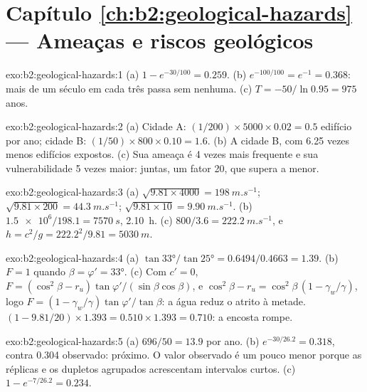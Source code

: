 \section*{Capítulo \ref{ch:b2:geological-hazards} --- Ameaças e riscos geológicos}

\begin{solution}{exo:b2:geological-hazards:1}
(a) $1 - e^{-30/100} = 0.259$. (b) $e^{-100/100} = e^{-1} = 0.368$: mais de um século em cada três
passa sem nenhuma. (c) $T = -50/\ln 0.95 = 975$ anos.
\end{solution}

\begin{solution}{exo:b2:geological-hazards:2}
(a) Cidade A: $(1/200) \times 5000 \times 0.02 = 0.5$ edifício por ano; cidade B: $(1/50) \times 800
\times 0.10 = 1.6$. (b) A cidade B, com 6.25 vezes menos edifícios expostos. (c) Sua ameaça é 4 vezes
mais frequente e sua vulnerabilidade 5 vezes maior: juntas, um fator 20, que supera a
 menor.
\end{solution}

\begin{solution}{exo:b2:geological-hazards:3}
(a) $\sqrt{9.81 \times 4000} = \qty{198}{m.s^{-1}}$; $\sqrt{9.81 \times 200} = \qty{44.3}{m.s^{-1}}$;
$\sqrt{9.81 \times 10} = \qty{9.90}{m.s^{-1}}$. (b) $\num{1.5e6}/198.1 = \qty{7570}{s}$, \qty{2.10}{h}.
(c) $800/3.6 = \qty{222.2}{m.s^{-1}}$, e $h = c^2/g = 222.2^2/9.81 = \qty{5030}{m}$.
\end{solution}

\begin{solution}{exo:b2:geological-hazards:4}
(a) $\tan\ang{33}/\tan\ang{25} = 0.6494/0.4663 = 1.39$. (b) $F = 1$ quando $\beta = \varphi' =
\ang{33}$. (c) Com $c' = 0$, $F = (\cos^2\beta - r_u)\tan\varphi'/(\sin\beta\cos\beta)$, e $\cos^2\beta
- r_u = \cos^2\beta\,(1 - \gamma_w/\gamma)$, logo $F = (1 - \gamma_w/\gamma)\tan\varphi'/\tan\beta$:
a água reduz o atrito à metade. $(1 - 9.81/20) \times 1.393 = 0.510 \times 1.393 = 0.710$: a
encosta rompe.
\end{solution}

\begin{solution}{exo:b2:geological-hazards:5}
(a) $696/50 = 13.9$ por ano. (b) $e^{-30/26.2} = 0.318$, contra 0.304 observado: próximo. O
valor observado é um pouco menor porque as réplicas e os dupletos agrupados acrescentam intervalos
curtos. (c) $1 - e^{-7/26.2} = 0.234$.
\end{solution}

